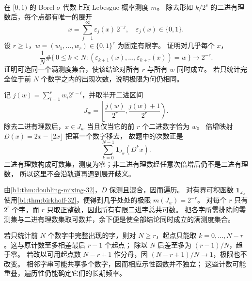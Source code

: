 \begin{exercise}\label{b1:ex:32-binary-word-frequencies}
在 \([0,1)\) 的 Borel \(\sigma\)-代数上取 Lebesgue 概率测度 \(m\)。
除去形如 \(k/2^s\) 的二进有理数后，每个点都有唯一的展开
\[
 x=\sum_{j=1}^\infty\varepsilon_j(x)\,2^{-j},
 \quad\varepsilon_j(x)\in\{0,1\}.
\]
设 \(r\geq1\)，\(w=(w_1,\ldots,w_r)\in\{0,1\}^r\) 为固定有限字。
证明对几乎每个 \(x\)，
\[
 \frac1N\#\{\,0\leq k<N:
       (\varepsilon_{k+1}(x),\ldots,\varepsilon_{k+r}(x))=w\,\}
 \longrightarrow 2^{-r}.
\]
证明可选同一个满测度集合，使该结论对所有 \(r\) 与所有 \(w\) 同时成立。
若只统计完全位于前 \(N\) 个数字之内的出现次数，说明极限为何仍相同。
\end{exercise}
\begin{solution}
记 \(j(w)=\sum_{i=1}^r w_i2^{r-i}\)，并取半开二进区间
\[
 J_w=\left[\frac{j(w)}{2^r},\frac{j(w)+1}{2^r}\right).
\]
除去二进有理数后，\(x\in J_w\) 当且仅当它的前 \(r\) 个二进数字恰为 \(w\)。
倍增映射 \(D(x)=2x-\lfloor2x\rfloor\) 把第一个数字移去，
故题中的次数正是
\[
 \sum_{k=0}^{N-1}\mathbf1_{J_w}(D^kx).
\]
二进有理数构成可数集，测度为零；非二进有理数经任意次倍增后仍不是二进有理数，
所以这里不会沿轨道再遇到展开歧义。

由\cref{b1:thm:doubling-mixing-32}，\(D\) 保测且混合，因而遍历。
对有界可积函数 \(\mathbf1_{J_w}\) 使用\cref{b1:thm:birkhoff-32}，便得到几乎处处的极限
\(m(J_w)=2^{-r}\)。
对每个 \(r\) 只有 \(2^r\) 个字，而 \(r\) 只取正整数，因此所有有限二进字总共可数。
把各字所需排除的零测集与二进有理数集取可数并，余下便是使全部结论同时成立的满测度集合。

若只统计前 \(N\) 个数字中完整出现的字，则对 \(N\geq r\)，起点只能取
\(k=0,\ldots,N-r\)。这与原计数至多相差最后 \(r-1\) 个起点；
除以 \(N\) 后差至多为 \((r-1)/N\)，趋于零。
若改以可用起点数 \(N-r+1\) 作分母，因 \((N-r+1)/N\to1\)，极限也不改变。
相邻字串可能共享多个数字，因而相应示性函数并不独立；
这些计数可能重叠，遍历性仍能确定它们的长期频率。
\end{solution}


